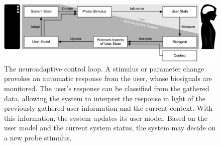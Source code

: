 \begin{figure}[t]
    \renewcommand\thefigure{\ref{chapter:nat}.S10}
    \centering
    \includegraphics[width=\textwidth]{figures/nat-app-fig-s10.pdf}
    \caption[The neuroadaptive control loop.]{The neuroadaptive control loop. A stimulus or parameter change provokes an automatic response from the user, whose biosignals are monitored. The user's response can be classified from the gathered data, allowing the system to interpret the response in light of the previously gathered user information and the current context. With this information, the system updates its user model. Based on the user model and the current system status, the system may decide on a new probe stimulus.}
\end{figure}

